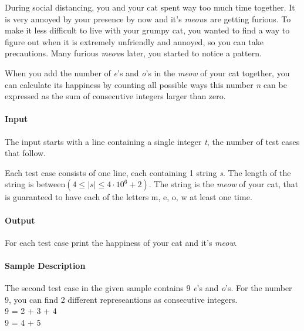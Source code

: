 




During social distancing, you and your cat spent way too much time together. It is very annoyed by your presence by now and it's \textit{meow}s are getting furious.
To make it less difficult to live with your grumpy cat, you wanted to find a way to figure out when it is extremely unfriendly and annoyed, so you can take precautions.
Many furious \textit{meow}s later, you started to notice a pattern.


When you add the number of \textit{e}'s and \textit{o}'s in the \textit{meow} of your cat together, you can calculate its happiness by counting all possible ways this number \textit{n} can be expressed as the sum of consecutive integers larger than zero.

\paragraph*{Input}

The input starts with a line containing a single integer \textit{t}, the number of test cases that follow.

Each test case consists of one line, each containing 1 string \textit{s}. The length of the string is between\begin{math}(4 \leq |s| \leq 4\cdot 10^6+2)\end{math}.
The string is the \textit{meow} of your cat, that is guaranteed to have each of the letters m, e, o, w at least one time.
\paragraph*{Output}

For each test case print the happiness of your cat and it's \textit{meow}.
\begin{samples}
\end{samples}

\paragraph*{Sample Description}
The second test case in the given sample contains 9 \textit{e}'s and \textit{o}'s. For the number 9, you can find 2 different represeantions as consecutive integers.\\
9 = 2 + 3 + 4\\
9 = 4 + 5

